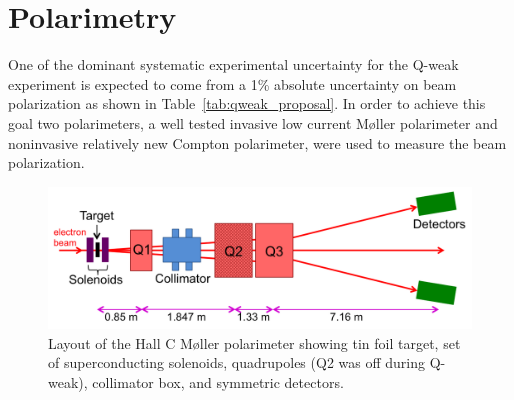 \section{Polarimetry}%
\label{Polarimetry}

One of the dominant systematic experimental uncertainty for the Q-weak experiment is expected to come from a 1\% absolute uncertainty on beam polarization as shown in Table~\ref{tab:qweak_proposal}. In order to achieve this goal two polarimeters, a well tested invasive low current M{\o}ller polarimeter and noninvasive relatively new Compton polarimeter, were used to measure the beam polarization.

\begin{singlespace}
\begin{figure}[!h]
	\begin{center}
	\includegraphics[width=15cm]{figures/moller}
	\caption
	{Layout of the Hall C M{\o}ller polarimeter showing tin foil target, set of superconducting solenoids, quadrupoles (Q2 was off during Q-weak), collimator box, and symmetric detectors.}
	\label{fig:moller}
	\end{center}
\end{figure}
\end{singlespace}


